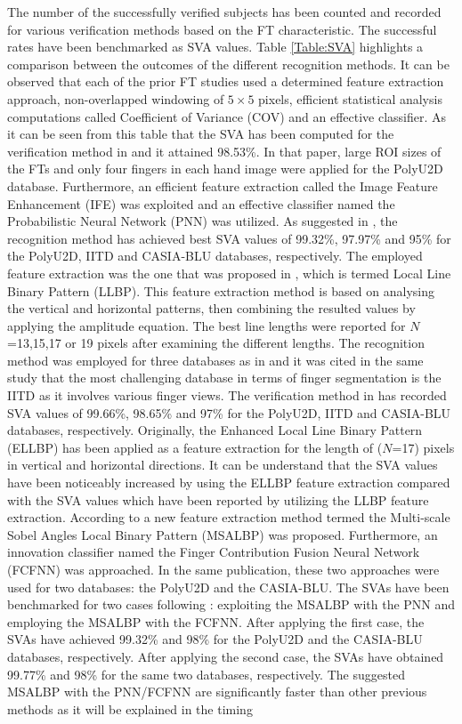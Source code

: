 \documentclass[conference]{IEEEtran}
\begin{document}
The number of the successfully verified subjects has been counted and recorded for various verification methods based on the FT characteristic. The successful rates have been benchmarked as SVA values. Table \ref{Table:SVA} highlights a comparison between the outcomes of the different recognition methods. It can be observed that each of the prior FT studies used a determined feature extraction approach, non-overlapped windowing of $5 \times 5$ pixels, efficient statistical analysis computations called Coefficient of Variance (COV) and an effective classifier. As it can be seen from this table that the SVA  has been computed for the verification method in \cite{Al-Nima2015Human} and it attained 98.53\%. In that paper, large ROI sizes of the FTs and only four fingers in each hand image were applied for the PolyU2D database. Furthermore, an efficient feature extraction called the Image Feature Enhancement (IFE) was exploited and an effective classifier named the Probabilistic Neural Network (PNN) was utilized. As suggested in \cite{Al-Nima2017efficient}, the recognition method has achieved best SVA values of 99.32\%, 97.97\% and 95\% for the PolyU2D, IITD and CASIA-BLU databases, respectively. The employed feature extraction was the one that was proposed in \cite{Petpon2009Face}, which is termed Local Line Binary Pattern (LLBP). This feature extraction method is based on analysing the vertical and horizontal patterns, then combining the resulted values by applying the amplitude equation. The best line lengths were reported for $N$=13,15,17 or 19 pixels after examining the different lengths. The recognition method was employed for three databases as in \cite{Al-Nima2017efficient} and it was cited in the same study that the most challenging database in terms of finger segmentation is the IITD as it involves various finger views. The verification method in \cite{Al-Nima2017Robust} has recorded SVA values of 99.66\%, 98.65\% and 97\% for the PolyU2D, IITD and CASIA-BLU databases, respectively. Originally, the Enhanced Local Line Binary Pattern (ELLBP) has been applied as a feature extraction for the length of ($N$=17) pixels in vertical and horizontal directions. It can be understand that the SVA values have been noticeably increased by using the ELLBP feature extraction compared with the SVA values which have been reported by utilizing the LLBP feature extraction. According to \cite{Al-Nima2017finger} a new feature extraction method termed the Multi-scale Sobel Angles Local Binary Pattern (MSALBP) was proposed. Furthermore, an innovation classifier named the Finger Contribution Fusion Neural Network (FCFNN) was approached. In the same publication, these two approaches were used for two databases: the PolyU2D and the CASIA-BLU. The SVAs have been benchmarked for two cases following \cite{Al-Nima2017finger}: exploiting the MSALBP with the PNN and employing the MSALBP with the FCFNN. After applying the first case, the SVAs have achieved 99.32\% and 98\% for the PolyU2D and the CASIA-BLU databases, respectively. After applying the second case, the SVAs have obtained 99.77\% and 98\% for the same two databases, respectively. The suggested MSALBP with the PNN/FCFNN are significantly faster than other previous methods as it will be explained in the timing 
\end{document}
